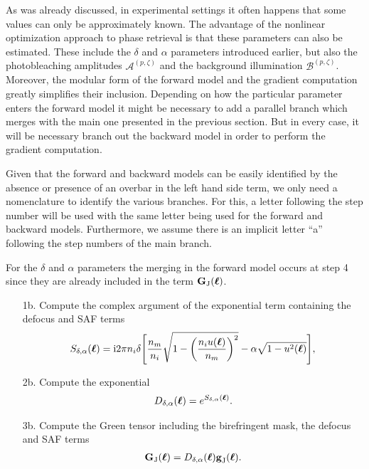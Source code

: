 \documentclass[reprint,aps,pra,superscriptaddress,
amsmath,amssymb]{revtex4-1}
\begin{document}
As was already discussed, in experimental settings it often happens that some values can only be approximately known. The advantage of the nonlinear optimization approach to phase retrieval is that these parameters can also be estimated. These include the $\delta$ and $\alpha$ parameters introduced earlier, but also the photobleaching amplitudes $ \mathcal{A}^{(p,\zeta)}$ and the background illumination $\mathcal{B}^{(p,\zeta)}$. Moreover, the modular form of the forward model and the gradient computation greatly simplifies their inclusion. Depending on how the particular parameter enters the forward model it might be necessary to add a parallel branch which merges with the main one presented in the previous section. But in every case, it will be necessary branch out the backward model in order to perform the gradient computation. 

Given that the forward and backward models can be easily identified by the absence or presence of an overbar in the left hand side term, we only need a nomenclature to identify the various branches. For this, a letter following the step number will be used with the same letter being used for the forward and backward models. Furthermore, we assume there is an implicit letter ``a'' following the step numbers of the main branch.

For the $\delta$ and $\alpha$ parameters  the merging in the forward model occurs at step 4 since they are already included in the term $ \textbf G_\text{J}  (\boldsymbol \ell)$. 
\begin{enumerate}
\item[1b.] Compute the complex argument of the exponential term containing the defocus and SAF terms
\begin{multline*}
S_{\delta, \alpha} (\boldsymbol \ell)=  \text{i} 2 \pi n_i  \delta \Bigg[ \frac{n_m}{n_i} \sqrt{1 - \left(\frac{n_i u(\boldsymbol \ell)}{n_m} \right)^2 }  
- \alpha \sqrt{1 - u^2(\boldsymbol \ell)} \Bigg]  , 
\end{multline*}
\item[2b.] Compute the exponential
\begin{align*}
D_{\delta, \alpha} (\boldsymbol \ell)= e^{S_{\delta, \alpha} (\boldsymbol \ell)} .
\end{align*}
\item[3b.] Compute the Green tensor including the birefringent mask, the defocus and SAF terms
\begin{align*}
 \textbf G_\text{J}  (\boldsymbol \ell) = D_{\delta, \alpha} (\boldsymbol \ell) \textbf g_\text{J} (\boldsymbol \ell) .
\end{align*}
\end{enumerate}
\end{document}
